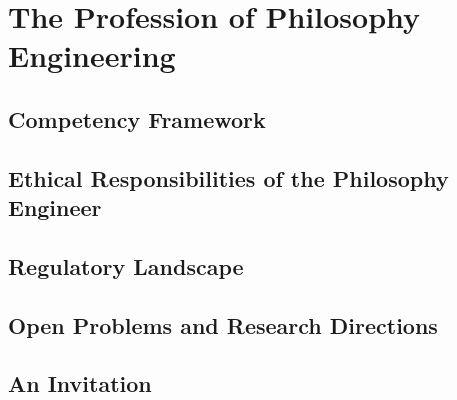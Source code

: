 \documentclass[12pt,letterpaper,twoside,openright]{book}
\theoremstyle{plain}
\theoremstyle{definition}
\theoremstyle{remark}
\begin{document}
\chapter{The Profession of Philosophy Engineering}
\label{ch:profession}

\section{Competency Framework}

\section{Ethical Responsibilities of the Philosophy Engineer}

\section{Regulatory Landscape}

\section{Open Problems and Research Directions}

\section{An Invitation}


\backmatter

\appendix
\end{document}
